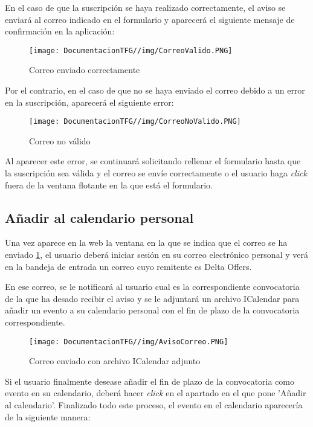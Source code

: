 En el caso de que la suscripción se haya realizado correctamente, el aviso se enviará al correo indicado en el formulario y aparecerá el siguiente mensaje de confirmación en la aplicación:

\begin{figure}[H]
    \centering
    \texttt{[image: DocumentacionTFG//img/CorreoValido.PNG]}
    \caption{Correo enviado correctamente}
    \label{fig:correo-enviado}
\end{figure}

Por el contrario, en el caso de que no se haya enviado el correo debido a un error en la suscripción, aparecerá el siguiente error: 

\begin{figure}[H]
    \centering
    \texttt{[image: DocumentacionTFG//img/CorreoNoValido.PNG]}
    \caption{Correo no válido}
    \label{fig:correo-no-valido}
\end{figure}

Al aparecer este error, se continuará solicitando rellenar el formulario hasta que la suscripción sea válida y el correo se envíe correctamente o el usuario haga \textit{click} fuera de la ventana flotante en la que está el formulario.


\subsection{Añadir al calendario personal}
Una vez aparece en la web la ventana en la que se indica que el correo se ha enviado \ref{fig:correo-enviado}, el usuario deberá iniciar sesión en su correo electrónico personal y verá en la bandeja de entrada un correo cuyo remitente es Delta Offers.

En ese correo, se le notificará al usuario cual es la correspondiente convocatoria de la que ha desado recibir el aviso y se le adjuntará un archivo ICalendar para añadir un evento a su calendario personal con el fin de plazo de la convocatoria correspondiente.

\begin{figure}[H]
    \centering
    \texttt{[image: DocumentacionTFG//img/AvisoCorreo.PNG]}
    \caption{Correo enviado con archivo ICalendar adjunto}
    \label{fig:enter-label}
\end{figure}

Si el usuario finalmente desease añadir el fin de plazo de la convocatoria como evento en su calendario, deberá hacer \textit{click} en el apartado en el que pone 'Añadir al calendario'. Finalizado todo este proceso, el evento en el calendario aparecería de la siguiente manera:

